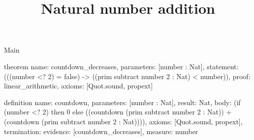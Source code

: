 \begin{lexlean}{Main}
\title{Natural number addition}
\begin{semanticmodule}
theorem{
  name: countdown_decreases,
  parameters: [number : Nat],
  statement: (((number <? 2) = false) -> ((prim subtract number 2 : Nat) < number)),
  proof: linear_arithmetic{},
  axioms: [Quot.sound, propext]
}

definition{
  name: countdown,
  parameters: [number : Nat],
  result: Nat,
  body: (if (number <? 2) then 0 else ((countdown (prim subtract number 2 : Nat)) + (countdown (prim subtract number 2 : Nat)))),
  axioms: [Quot.sound, propext],
  termination: {evidence: [countdown_decreases], measure: number}
}
\end{semanticmodule}
\end{lexlean}
